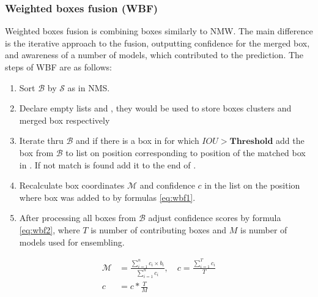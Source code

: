 \subsubsection{Weighted boxes fusion (WBF)}
Weighted boxes fusion is combining boxes similarly to NMW. The main difference is the iterative approach to the fusion, outputting confidence for the merged box, and awareness of a number of models, which contributed to the prediction.
The steps of WBF are as follows:
\begin{enumerate}
    \item Sort $\mathcal{B}$ by $\mathcal{S}$ as in NMS.
    \item Declare empty lists  and , they would be used to store boxes clusters and merged box respectively
    \item Iterate thru $\mathcal{B}$ and if there is a box in  for which $IOU > \mathbf{Threshold}$ add the box from $\mathcal{B}$ to list  on position corresponding to position of the matched box in . If not match is found add it to the end of .
    \item Recalculate box coordinates $\mathcal{M}$ and confidence $c$ in the list  on the position where box was added to  by formulas \ref{eq:wbf1}.
    \item After processing all boxes from $\mathcal{B}$ adjust confidence scores by formula \ref{eq:wbf2}, where $T$ is number of contributing boxes and $M$ is number of models used for ensembling.
\end{enumerate}
\begin{align}
    \mathcal{M} & = \frac{\sum_{i=1}^n c_i \times b_i}{\sum_{i=1}^n c_i} ,\quad c=\frac{\sum_{i=1}^{T}c_i}{T} \label{eq:wbf1} \\
    c           & = c * \frac{T}{M} \label{eq:wbf2}
\end{align}

